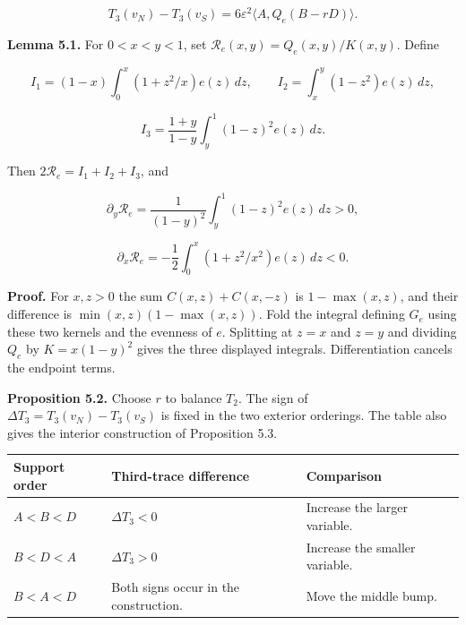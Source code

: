 \documentclass[11pt,letterpaper]{article}
\begin{document}
\[T_3(v_N)-T_3(v_S)=6\varepsilon^2\langle A,Q_e(B-rD)\rangle.\]

\textbf{Lemma 5.1.} For \(0<x<y<1\), set \(\mathcal R_e(x,y)=Q_e(x,y)/K(x,y)\). Define

\[I_1=(1-x)\int_0^x(1+z^2/x)e(z)\,dz,\qquad I_2=\int_x^y(1-z^2)e(z)\,dz,\]

\[I_3=\frac{1+y}{1-y}\int_y^1(1-z)^2e(z)\,dz.\]

Then \(2\mathcal R_e=I_1+I_2+I_3\), and

\[\partial_y\mathcal R_e=\frac{1}{(1-y)^2}\int_y^1(1-z)^2e(z)\,dz>0,\]

\[\partial_x\mathcal R_e=-\frac12\int_0^x(1+z^2/x^2)e(z)\,dz<0.\]

\textbf{Proof.} For \(x,z>0\) the sum \(C(x,z)+C(x,-z)\) is \(1-\max(x,z)\), and their
difference is \(\min(x,z)(1-\max(x,z))\). Fold the integral defining \(G_e\) using these two
kernels and the evenness of \(e\). Splitting at \(z=x\) and \(z=y\) and dividing \(Q_e\) by
\(K=x(1-y)^2\) gives the three displayed integrals. Differentiation cancels the endpoint
terms.

\textbf{Proposition 5.2.} Choose \(r\) to balance \(T_2\). The sign of
\(\Delta T_3=T_3(v_N)-T_3(v_S)\) is fixed in the two exterior orderings. The table also
gives the interior construction of Proposition 5.3.

{%
\begin{longtable}[]{@{}
  >{\raggedright\arraybackslash}p{}
  >{\raggedright\arraybackslash}p{}
  >{\raggedright\arraybackslash}p{}@{}}
\toprule\noalign{}
\begin{minipage}[b]{\linewidth}\raggedright
Support order
\end{minipage} & \begin{minipage}[b]{\linewidth}\raggedright
Third-trace difference
\end{minipage} & \begin{minipage}[b]{\linewidth}\raggedright
Comparison
\end{minipage} \\
\midrule\noalign{}
\endhead
\bottomrule\noalign{}
\endlastfoot
\(A<B<D\) & \(\Delta T_3<0\) & Increase the larger variable. \\
\(B<D<A\) & \(\Delta T_3>0\) & Increase the smaller variable. \\
\(B<A<D\) & Both signs occur in the construction. & Move the middle bump. \\
\end{longtable}
}
\end{document}
